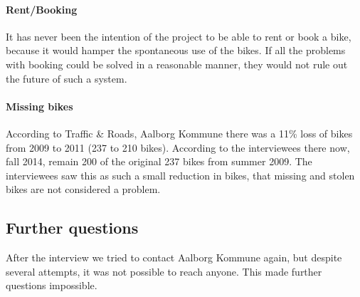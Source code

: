 \paragraph{Rent/Booking}
It has never been the intention of the project to be able to rent or book a bike, because it would hamper the spontaneous use of the bikes.
If all the problems with booking could be solved in a reasonable manner, they would not rule out the future of such a system.

\paragraph{Missing bikes}
According to Traffic \& Roads, Aalborg Kommune\cite{cykelplanlaegning} there was a 11\% loss of bikes from 2009 to 2011 (237 to 210 bikes).
According to the interviewees there now, fall 2014, remain 200 of the original 237 bikes from summer 2009.
The interviewees saw this as such a small reduction in bikes, that missing and stolen bikes are not considered a problem.

\subsection{Further questions}
After the interview we tried to contact Aalborg Kommune again, but despite several attempts, it was not possible to reach anyone.
This made further questions impossible.
